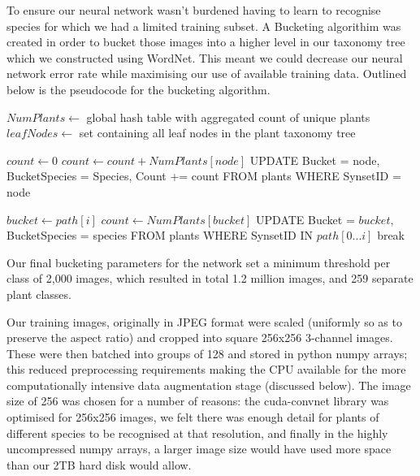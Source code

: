 \documentclass[a4paper,11pt]{article}
\begin{document}
\begin{description}
\hspace{5 mm} To ensure our neural network wasn’t burdened having to learn to recognise species for which we had a limited training subset. A Bucketing algorithim was created in order to bucket those images into a higher level in our taxonomy tree which we constructed using WordNet\cite{wordnet}. This meant we could decrease our neural network error rate while maximising our use of available training data. Outlined below is the pseudocode for the bucketing algorithm.\\

\begin{algorithmic}[1]
	\State $NumPlants \gets$ global hash table with aggregated count of unique plants
	\State $leafNodes \gets$ set containing all leaf nodes in the plant taxonomy tree
	\EndFor
	\EndFor
\EndProcedure 
\Statex
\end{algorithmic}

\begin{algorithmic}[1]
	\State $count \gets 0$
		\State $count \gets count+NumPlants[node]$
		\State UPDATE Bucket = node, BucketSpecies = Species, Count += count 
		\State		FROM plants 
		\State		WHERE SynsetID = node
	\EndFor
\EndProcedure 
\Statex
\end{algorithmic}

\begin{algorithmic}[1]
		\State $bucket \gets path[i]$
		\State $count \gets NumPlants[bucket]$
			\State UPDATE Bucket = $bucket$, BucketSpecies = species 
			\State		FROM plants 
			\State		WHERE SynsetID IN $path[0 ... i]$
			\State break
		\EndIf
	\EndFor
\EndProcedure 
\Statex
\end{algorithmic} 


Our final bucketing parameters for the network set a minimum threshold per class of 2,000 images, which resulted in total 1.2 million images, and 259 separate plant classes.

\hspace{5 mm} Our training images, originally in JPEG format were scaled (uniformly so as to preserve the aspect ratio) and cropped into square 256x256 3-channel images. These were then batched into groups of 128 and stored in python numpy arrays; this reduced preprocessing requirements making the CPU available for the more computationally intensive data augmentation stage (discussed below). The image size of 256 was chosen for a number of reasons: the cuda-convnet library was optimised for 256x256 images, we felt there was enough detail for plants of different species to be recognised at that resolution, and finally in the highly uncompressed numpy arrays, a larger image size would have used more space than our 2TB hard disk would allow.


\end{description}
\end{document}
